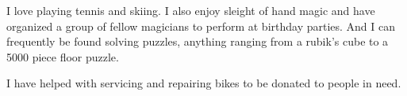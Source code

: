 \documentclass[9pt]{developercv} %
\begin{document}

\begin{minipage}[t]{0.4\textwidth}
	\vspace{-\baselineskip} %
	
	
	I love playing tennis and skiing. I also enjoy sleight of hand magic and have organized a group of fellow magicians to perform at birthday parties.
	And I can frequently be found solving puzzles, anything ranging from a rubik's cube to a 5000 piece floor puzzle.  
\end{minipage}
\hfill
\begin{minipage}[t]{0.4\textwidth}
	\vspace{-\baselineskip} %
	
	
	I have helped with servicing and repairing bikes to be donated to people in need.
\end{minipage}

\end{document}
